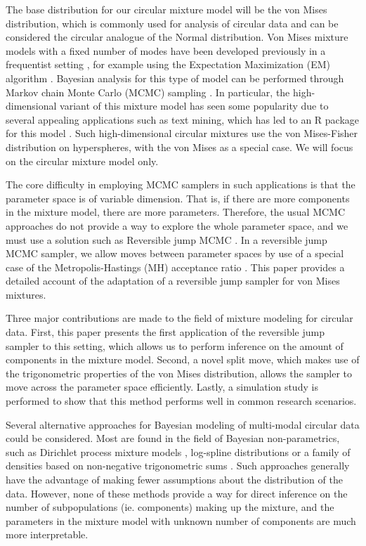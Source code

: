 The base distribution for our circular mixture model will be the von Mises distribution, which is commonly used for analysis of circular data and can be considered the circular analogue of the Normal distribution. Von Mises mixture models with a fixed number of modes have been developed previously in a frequentist setting \citep{mooney2003fitting}, for example using the Expectation Maximization (EM) algorithm \citep{McLachlan:P5Bg7scy, Banerjee:2005tk}. Bayesian analysis for this type of model can be performed through Markov chain Monte Carlo (MCMC) sampling \citep{Tierney:1994fc, Besag:1995de}. In particular, the high-dimensional variant of this mixture model has seen some popularity due to several appealing applications such as text mining, which has led to an R package for this model \citep{hornik2014movmf}. Such high-dimensional circular mixtures use the von Mises-Fisher distribution on hyperspheres, with the von Mises as a special case. We will focus on the circular mixture model only. 

The core difficulty in employing MCMC samplers in such applications is that the parameter space is of variable dimension. That is, if there are more components in the mixture model, there are more parameters. Therefore, the usual MCMC approaches do not provide a way to explore the whole parameter space, and we must use a solution such as Reversible jump MCMC \citep{Green:1995ut, Richardson:1997di}. In a reversible jump MCMC sampler, we allow moves between parameter spaces by use of a special case of the Metropolis-Hastings (MH) acceptance ratio \citep{Hastings:1970wm}. This paper provides a detailed account of the adaptation of a reversible jump sampler for von Mises mixtures. 

Three major contributions are made to the field of mixture modeling for circular data. First, this paper presents the first application of the reversible jump sampler to this setting, which allows us to perform inference on the amount of components in the mixture model. Second, a novel split move, which makes use of the trigonometric properties of the von Mises distribution, allows the sampler to move across the parameter space efficiently. Lastly, a simulation study is performed to show that this method performs well in common research scenarios. 

Several alternative approaches for Bayesian modeling of multi-modal circular data could be considered. Most are found in the field of Bayesian non-parametrics, such as Dirichlet process mixture models \citep{Ghosh:2003ds},  log-spline distributions \citep{Ferreira:2008gv} or a family of densities based on non-negative trigonometric sums \citep{FernandezDuran:2016bm}. Such approaches generally have the advantage of making fewer assumptions about the distribution of the data. However, none of these methods provide a way for direct inference on the number of subpopulations (ie. components) making up the mixture, and the parameters in the mixture model with unknown number of components are much more interpretable. 

